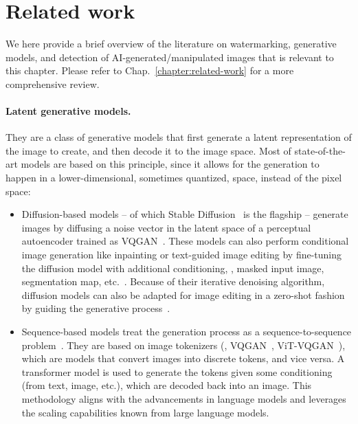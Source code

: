 
\section{Related work}

We here provide a brief overview of the literature on watermarking, generative models, and detection of AI-generated/manipulated images that is relevant to this chapter. 
Please refer to Chap.~\ref{chapter:related-work} for a more comprehensive review.

\paragraph{Latent generative models.} 
They are a class of generative models that first generate a latent representation of the image to create, and then decode it to the image space.
Most of state-of-the-art models are based on this principle, since it allows for the generation to happen in a lower-dimensional, sometimes quantized, space, instead of the pixel space:
\begin{itemize}
    \item Diffusion-based models -- of which Stable Diffusion~\citep{rombach2022high} is the flagship -- generate images by diffusing a noise vector in the latent space of a perceptual autoencoder trained as VQGAN~\citep{esser2021taming}.
    These models can also perform conditional image generation like inpainting or text-guided image editing by fine-tuning the diffusion model with additional conditioning, \eg, masked input image, segmentation map, etc.~\citep{lugmayr2022repaint, saharia2022palette}.
    Because of their iterative denoising algorithm, diffusion models can also be adapted for image editing in a zero-shot fashion by guiding the generative process~\citep{couairon2022diffedit, hertz2022prompt, kawar2022imagic, mokady2022null, valevski2022unitune, wu2022unifying}.
    \item Sequence-based models treat the generation process as a sequence-to-sequence problem~\citep{ramesh2021zero, ding2021cogview, esser2021taming, gafni2022make, singer2022makeavideo, yu2022scaling, team2024chameleon}. 
    They are based on image tokenizers (\eg, VQGAN~\citep{esser2021taming}, ViT-VQGAN~\citep{yu2021vector}), which are models that convert images into discrete tokens, and vice versa.
    A transformer model is used to generate the tokens given some conditioning (from text, image, etc.), which are decoded back into an image.
    This methodology aligns with the advancements in language models and leverages the scaling capabilities known from large language models.
\end{itemize}

